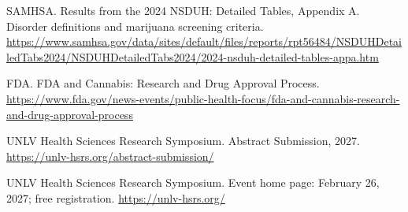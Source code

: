 \documentclass[10pt]{article}
\begin{document}
\begin{enumerate}[label={[\arabic*]},itemsep=7pt]
\item SAMHSA. Results from the 2024 NSDUH: Detailed Tables, Appendix A. Disorder definitions and marijuana screening criteria. \url{https://www.samhsa.gov/data/sites/default/files/reports/rpt56484/NSDUHDetailedTabs2024/NSDUHDetailedTabs2024/2024-nsduh-detailed-tables-appa.htm}
\item FDA. FDA and Cannabis: Research and Drug Approval Process. \url{https://www.fda.gov/news-events/public-health-focus/fda-and-cannabis-research-and-drug-approval-process}
\item UNLV Health Sciences Research Symposium. Abstract Submission, 2027. \url{https://unlv-hsrs.org/abstract-submission/}
\item UNLV Health Sciences Research Symposium. Event home page: February 26, 2027; free registration. \url{https://unlv-hsrs.org/}
\end{enumerate}
\end{document}
